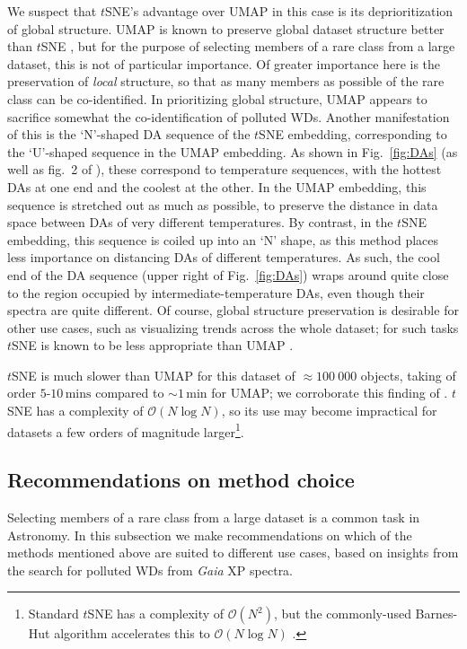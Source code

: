 \documentclass[fleqn,usenatbib]{rasti}
\begin{document}
We suspect that $t$SNE's advantage over UMAP in this case is its deprioritization of global structure.
UMAP is known to preserve global dataset structure better than $t$SNE \citep{mcinnes18, fotopoulou24}, but for the purpose of selecting members of a rare class from a large dataset, this is not of particular importance.
Of greater importance here is the preservation of \textit{local} structure, so that as many members as possible of the rare class can be co-identified.
In prioritizing global structure, UMAP appears to sacrifice somewhat the co-identification of polluted WDs.
Another manifestation of this is the `N'-shaped DA sequence of the $t$SNE embedding, corresponding to the `U'-shaped sequence in the UMAP embedding.
As shown in Fig.~\ref{fig:DAs} (as well as fig.~2 of \citealt{kao24}), these correspond to temperature sequences, with the hottest DAs at one end and the coolest at the other.
In the UMAP embedding, this sequence is stretched out as much as possible, to preserve the distance in data space between DAs of very different temperatures.
By contrast, in the $t$SNE embedding, this sequence is coiled up into an `N' shape, as this method places less importance on distancing DAs of different temperatures.
As such, the cool end of the DA sequence (upper right of Fig.~\ref{fig:DAs}) wraps around quite close to the region occupied by intermediate-temperature DAs, even though their spectra are quite different.
Of course, global structure preservation is desirable for other use cases, such as visualizing trends across the whole dataset; for such tasks $t$SNE is known to be less appropriate than UMAP \citep{mcinnes18}.

$t$SNE is much slower than UMAP for this dataset of $\approx 100~000$ objects, taking of order $5\text{-}10\,\text{mins}$ compared to $\sim1\,\text{min}$ for UMAP; we corroborate this finding of \citet{kao24}.
$t$SNE has a complexity of $\mathcal{O}(N \log N)$, so its use may become impractical for datasets a few orders of magnitude larger\footnote{
    Standard $t$SNE has a complexity of $\mathcal{O}(N^2)$, but the commonly-used Barnes-Hut algorithm \citep{barnes86} accelerates this to $\mathcal{O}(N\log N)$ \citep{vandermaaten13}.
}.


\subsection{Recommendations on method choice}

Selecting members of a rare class from a large dataset is a common task in Astronomy.
In this subsection we make recommendations on which of the methods mentioned above are suited to different use cases, based on insights from the search for polluted WDs from \textit{Gaia} XP spectra.
\end{document}
